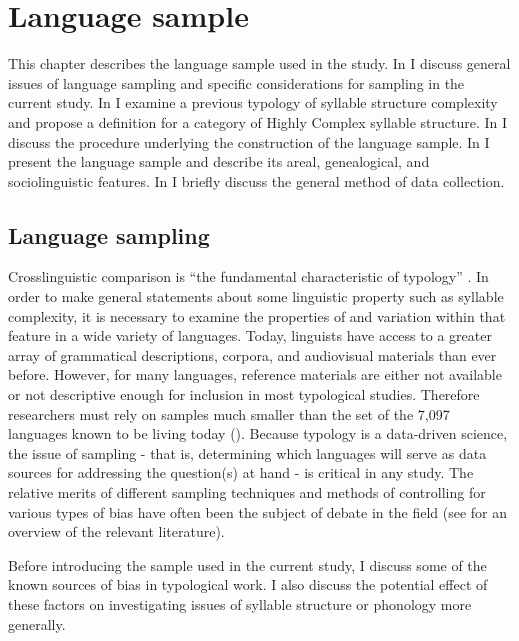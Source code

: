 \chapter{Language sample}\label{sec:2}

  This chapter describes the language sample used in the study. In  I discuss general issues of language sampling and specific considerations for sampling in the current study. In  I examine a previous typology of syllable structure complexity and propose a definition for a category of Highly Complex syllable structure. In  I discuss the procedure underlying the construction of the language sample. In  I present the language sample and describe its areal, genealogical, and sociolinguistic features. In  I briefly discuss the general method of data collection.

\section{Language sampling}\label{sec:2.1}

  Crosslinguistic comparison is “the fundamental characteristic of typology” \citep[6]{Croft2003}. In order to make general statements about some linguistic property such as syllable complexity, it is necessary to examine the properties of and variation within that feature in a wide variety of languages. Today, linguists have access to a greater array of grammatical descriptions, corpora, and audiovisual materials than ever before. However, for many languages, reference materials are either not available or not descriptive enough for inclusion in most typological studies. Therefore researchers must rely on samples much smaller than the set of the 7,097 languages known to be living today (\citealt{SimonsFennig2018}). Because typology is a data-driven science, the issue of sampling - that is, determining which languages will serve as data sources for addressing the question(s) at hand - is critical in any study. The relative merits of different sampling techniques and methods of controlling for various types of bias have often been the subject of debate in the field (see \citealt{Bakker2011} for an overview of the relevant literature). 

  Before introducing the sample used in the current study, I discuss some of the known sources of bias in typological work. I also discuss the potential effect of these factors on investigating issues of syllable structure or phonology more generally.

